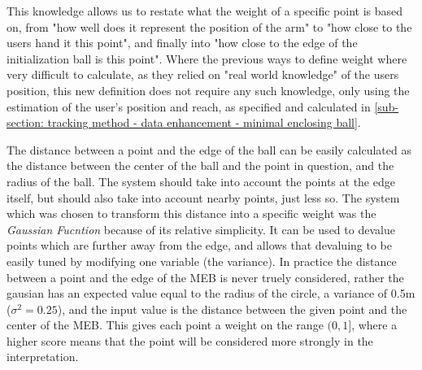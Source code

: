 This knowledge allows us to restate what the weight of a specific point is based on, from "how well does it represent the position of the arm" to "how close to the users hand it this point", and finally into "how close to the edge of the initialization ball is this point".
Where the previous ways to define weight where very difficult to calculate, as they relied on "real world knowledge" of the users position, this new definition does not require any such knowledge, only using the estimation of the user's position and reach, as specified and calculated in \cref{sub-section: tracking method - data enhancement - minimal enclosing ball}.

The distance between a point and the edge of the ball can be easily calculated as the distance between the center of the ball and the point in question, and the radius of the ball.
The system should take into account the points at the edge itself, but should also take into account nearby points, just less so.
The system which was chosen to transform this distance into a specific weight was the \textit{Gaussian Fucntion} because of its relative simplicity.
It can be used to devalue points which are further away from the edge, and allows that devaluing to be easily tuned by modifying one variable (the variance).
In practice the distance between a point and the edge of the MEB is never truely considered, rather the gausian has an expected value equal to the radius of the circle, a variance of 0.5m ($\sigma^2 = 0.25$), and the input value is the distance between the given point and the center of the MEB.
This gives each point a weight on the range $(0, 1]$, where a higher score means that the point will be considered more strongly in the interpretation.






